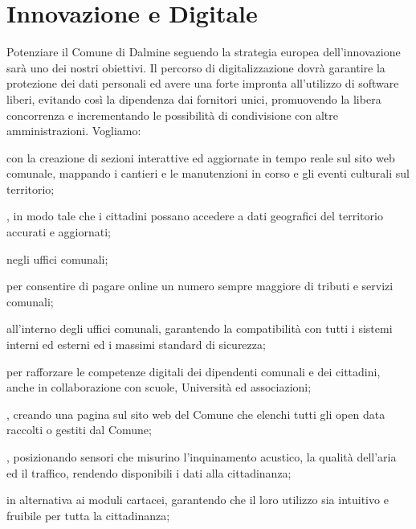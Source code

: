 \section{Innovazione e Digitale}
Potenziare il Comune di Dalmine seguendo la strategia europea dell'innovazione sarà uno dei nostri obiettivi. Il percorso di digitalizzazione dovrà garantire la protezione dei dati personali ed avere una forte impronta all'utilizzo di software liberi, evitando così la dipendenza dai fornitori unici, promuovendo la libera concorrenza e incrementando le possibilità di condivisione con altre amministrazioni. Vogliamo:

 con la creazione di sezioni interattive ed aggiornate in tempo reale sul sito web comunale, mappando i cantieri e le manutenzioni in corso e gli eventi culturali sul territorio;

, in modo tale che i cittadini possano accedere a dati geografici del territorio accurati e aggiornati;

 negli uffici comunali;

 per consentire di pagare online un numero sempre maggiore di tributi e servizi comunali;

 all'interno degli uffici comunali, garantendo la compatibilità con tutti i sistemi interni ed esterni ed i massimi standard di sicurezza;

 per rafforzare le competenze digitali dei dipendenti comunali e dei cittadini, anche in collaborazione con scuole, Università ed associazioni;

, creando una pagina sul sito web del Comune che elenchi tutti gli open data raccolti o gestiti dal Comune;

, posizionando sensori che misurino l'inquinamento acustico, la qualità dell'aria ed il traffico, rendendo disponibili i dati alla cittadinanza;

 in alternativa ai moduli cartacei, garantendo che il loro utilizzo sia intuitivo e fruibile per tutta la cittadinanza;

